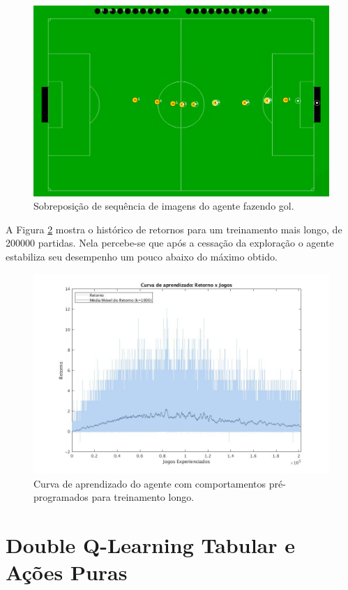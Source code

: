 \begin{figure}[H]
	\includegraphics[width=0.9\linewidth]{figs/goal-sequence.png}
	\centering
	\caption{Sobreposição de sequência de imagens do agente fazendo gol.}
	\label{fig:goal-seq}
\end{figure}

A Figura \ref{fig:curvalonga-bhv} mostra o histórico de retornos para um treinamento mais longo, de 200000 partidas. Nela percebe-se que após a cessação da exploração o agente estabiliza seu desempenho um pouco abaixo do máximo obtido.

\begin{figure}[H]
	\includegraphics[width=0.9\linewidth]{figs/curvalonga-behaviors-tabular.jpg}
	\centering
	\caption{Curva de aprendizado do agente com comportamentos pré-programados para treinamento longo.}
	\label{fig:curvalonga-bhv}
\end{figure}

\section{Double Q-Learning Tabular e Ações Puras}

